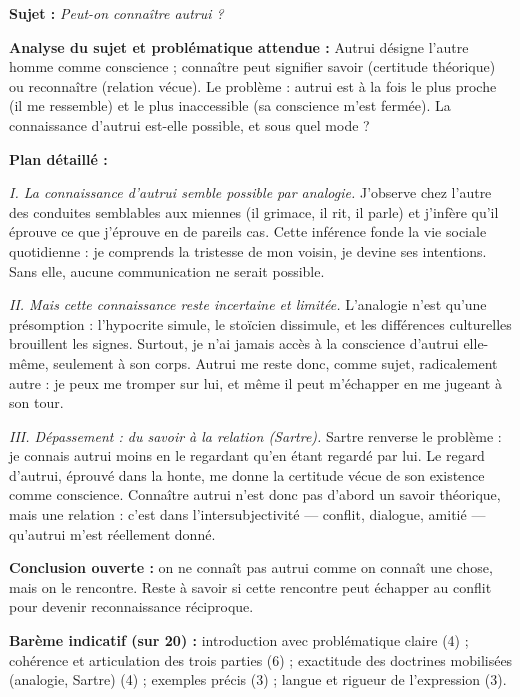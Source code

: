 \documentclass[11pt]{article}
\begin{document}
\begin{corrige}
\textbf{Sujet :} \emph{Peut-on connaître autrui ?}

\textbf{Analyse du sujet et problématique attendue :} \guillemotleft Autrui \guillemotright désigne l'autre homme comme conscience ; \guillemotleft connaître \guillemotright peut signifier savoir (certitude théorique) ou reconnaître (relation vécue). Le problème : autrui est à la fois le plus proche (il me ressemble) et le plus inaccessible (sa conscience m'est fermée). La connaissance d'autrui est-elle possible, et sous quel mode ?

\textbf{Plan détaillé :}

\emph{I. La connaissance d'autrui semble possible par analogie.} J'observe chez l'autre des conduites semblables aux miennes (il grimace, il rit, il parle) et j'infère qu'il éprouve ce que j'éprouve en de pareils cas. Cette inférence fonde la vie sociale quotidienne : je comprends la tristesse de mon voisin, je devine ses intentions. Sans elle, aucune communication ne serait possible.

\emph{II. Mais cette connaissance reste incertaine et limitée.} L'analogie n'est qu'une présomption : l'hypocrite simule, le stoïcien dissimule, et les différences culturelles brouillent les signes. Surtout, je n'ai jamais accès à la conscience d'autrui elle-même, seulement à son corps. Autrui me reste donc, comme sujet, radicalement autre : je peux me tromper sur lui, et même il peut m'échapper en me jugeant à son tour.

\emph{III. Dépassement : du savoir à la relation (Sartre).} Sartre renverse le problème : je connais autrui moins en le regardant qu'en étant regardé par lui. Le regard d'autrui, éprouvé dans la honte, me donne la certitude vécue de son existence comme conscience. Connaître autrui n'est donc pas d'abord un savoir théorique, mais une relation : c'est dans l'intersubjectivité — conflit, dialogue, amitié — qu'autrui m'est réellement donné.

\textbf{Conclusion ouverte :} on ne connaît pas autrui comme on connaît une chose, mais on le rencontre. Reste à savoir si cette rencontre peut échapper au conflit pour devenir reconnaissance réciproque.

\textbf{Barème indicatif (sur 20) :} introduction avec problématique claire (4) ; cohérence et articulation des trois parties (6) ; exactitude des doctrines mobilisées (analogie, Sartre) (4) ; exemples précis (3) ; langue et rigueur de l'expression (3).


\end{corrige}
\end{document}
